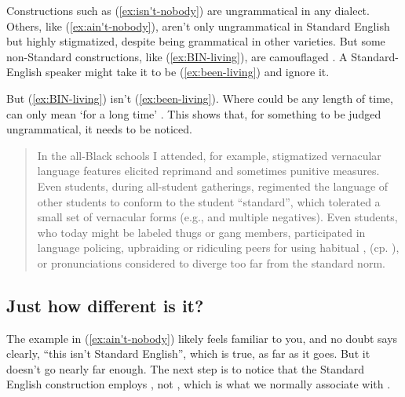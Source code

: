 Constructions such as (\ref{ex:isn't-nobody}) are ungrammatical in any dialect. Others, like (\ref{ex:ain't-nobody}), aren't only ungrammatical in Standard English but highly stigmatized, despite being grammatical in other varieties. But some non-Standard constructions, like (\ref{ex:BIN-living}), are camouflaged \citep{Spears2015}. A Standard-English speaker might take it to be (\ref{ex:been-living}) and ignore it.

\ea
     \label{ex:BIN-living}
     \label{ex:been-living}
    \z
\z

But (\ref{ex:BIN-living}) isn't (\ref{ex:been-living}). Where  could be any length of time,  can only mean `for a long time' \citep{Spears2015}. This shows that, for something to be judged ungrammatical, it needs to be noticed.

\begin{quote}
    In the all-Black schools I attended, for example, stigmatized vernacular language
features elicited reprimand and sometimes punitive measures. Even students, during all-student gatherings, regimented the language of other students to conform to the student \enquote{standard}, which tolerated a small set of vernacular forms (e.g.,  and multiple negatives). Even students, who today might be labeled thugs or gang members, participated in language policing, upbraiding or ridiculing peers for using habitual ,  (cp. ), or pronunciations considered to diverge too far from the standard norm. \cite[796]{Spears2015}
\end{quote}

\subsection{Just how different is it?}

The example in (\ref{ex:ain't-nobody}) likely feels familiar to you, and no doubt  says clearly, \enquote{this isn't Standard English}, which is true, as far as it goes. But it doesn't go nearly far enough. The next step is to notice that the Standard English construction employs , not , which is what we normally associate with .

